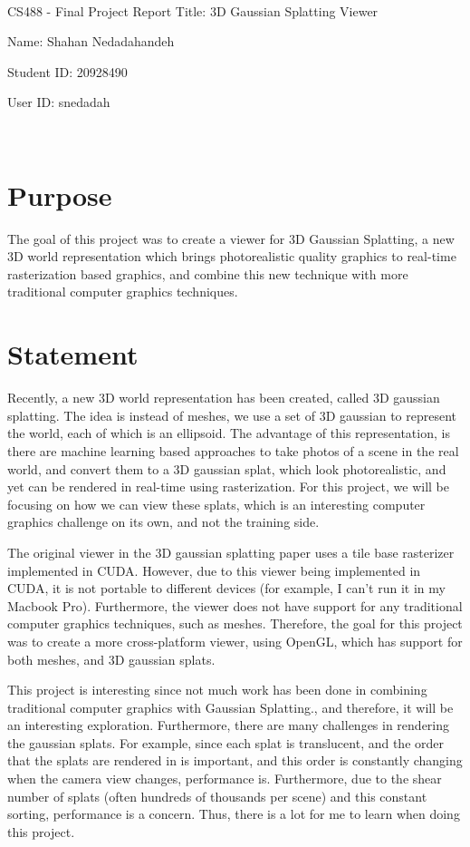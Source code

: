 \documentclass {article}
\begin{document}
~\vfill
\begin{center}
\Large

CS488 - Final Project Report
Title: 3D Gaussian Splatting Viewer

Name: Shahan Nedadahandeh

Student ID: 20928490

User ID: snedadah

\end{center}
\vfill ~\vfill~
\newpage

\section{Purpose}
     The goal of this project was to create a viewer for 3D Gaussian Splatting, a new 3D world representation which brings photorealistic quality graphics to real-time rasterization based graphics, and combine this new technique with more traditional computer graphics techniques.

\section{Statement}
     Recently, a new 3D world representation has been created, called 3D gaussian splatting. The idea is instead of meshes, we use a set of 3D gaussian to represent the world, each of which is an ellipsoid. The advantage of this representation, is there are machine learning based approaches to take photos of a scene in the real world, and convert them to a 3D gaussian splat, which look photorealistic, and yet can be rendered in real-time using rasterization. For this project, we will be focusing on how we can view these splats, which is an interesting computer graphics challenge on its own, and not the training side.

     The original viewer in the 3D gaussian splatting paper uses a tile base rasterizer implemented in CUDA. However, due to this viewer being implemented in CUDA, it is not portable to different devices (for example, I can't run it in my Macbook Pro). Furthermore, the viewer does not have support for any traditional computer graphics techniques, such as meshes. Therefore, the goal for this project was to create a more cross-platform viewer, using OpenGL, which has support for both meshes, and 3D gaussian splats.
     
     This project is interesting since not much work has been done in combining traditional computer graphics with Gaussian Splatting., and therefore, it will be an interesting exploration. Furthermore, there are many challenges in rendering the gaussian splats. For example, since each splat is translucent, and the order that the splats are rendered in is important, and this order is constantly changing when the camera view changes, performance is. Furthermore, due to the shear number of splats (often hundreds of thousands per scene) and this constant sorting, performance is a concern. Thus, there is a lot for me to learn when doing this project.
\end{document}
